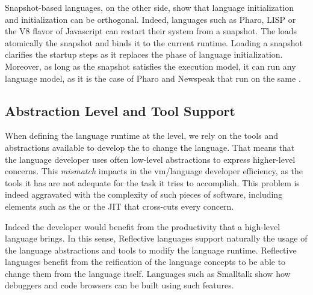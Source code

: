 Snapshot-based languages, on the other side, show that language initialization and \VM initialization can be orthogonal. Indeed, languages such as Pharo, LISP or the V8 flavor of Javascript can restart their system from a snapshot. The \VM loads atomically the snapshot and binds it to the current runtime. Loading a snapshot clarifies the \VM startup steps as it replaces the phase of language initialization. Moreover, as long as the snapshot satisfies the \VM execution model, it can run any language model, as it is the case of Pharo and Newspeak that run on the same \VM.



\subsection{Abstraction Level and Tool Support}

When defining the language runtime at the \VM level, we rely on the tools and abstractions available to develop the \VM to change the language. That means that the language developer uses often low-level abstractions to express higher-level concerns. This \emph{mismatch} impacts in the vm/language developer efficiency, as the tools it has are not adequate for the task it tries to accomplish. This problem is indeed aggravated with the complexity of such pieces of software, including elements such as the \GC or the JIT that cross-cuts every \VM concern.

Indeed the developer would benefit from the productivity that a high-level language brings. In this sense, Reflective languages support naturally the usage of the language abstractions and tools to modify the language runtime. Reflective languages benefit from the reification of the language concepts to be able to change them from the language itself. Languages such as Smalltalk show how debuggers and code browsers can be built using such features.

